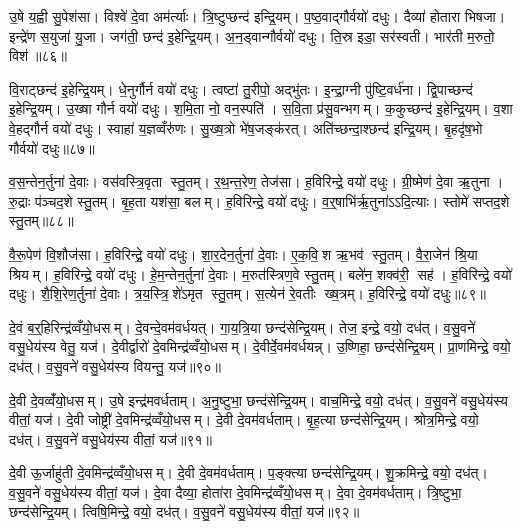 उ॒षे य॒ह्वी सु॒पेश॑सा। विश्वे॑ दे॒वा अम॑र्त्याः। त्रि॒ष्टुप्छन्द॑ इन्द्रि॒यम्। प॒ष्ठ॒वाद्गौर्वयो॑ दधुः। दैव्या॑ होतारा भिषजा। इन्द्रे॑ण स॒युजा॑ यु॒जा। जग॑ती॒ छन्द॑ इ॒हेन्द्रि॒यम्। अ॒न॒ड्वान्गौर्वयो॑ दधुः। ति॒स्र इडा॒ सर॑स्वती। भार॑ती म॒रुतो॒ विश॑॥८६॥

वि॒राट्छन्द॑ इ॒हेन्द्रि॒यम्। धे॒नुर्गौर्न वयो॑ दधुः। त्वष्टा॑ तु॒रीपो॒ अद्भु॑तः। इ॒न्द्रा॒ग्नी पु॑ष्टि॒वर्ध॑ना। द्वि॒पाच्छन्द॑ इ॒हेन्द्रि॒यम्। उ॒ख्षा गौर्न वयो॑ दधुः। श॒मि॒ता नो॒ वन॒स्पति॑। स॒वि॒ता प्र॑सु॒वन्भगम्। क॒कुच्छन्द॑ इ॒हेन्द्रि॒यम्। व॒शा वे॒हद्गौर्न वयो॑ दधुः। स्वाहा॑ य॒ज्ञव्वँरु॑णः। सु॒ख्ष॒त्रो भे॑ष॒जङ्क॑रत्। अति॑च्छन्दा॒श्छन्द॑ इन्द्रि॒यम्। बृ॒हदृ॑ष॒भो गौर्वयो॑ दधुः॥८७॥\anuvakamend[अम॑र्त्यस्तुर्य॒वाड्गौर्वयो॑ दधु॒र्विशो॑ व॒शा वे॒हद्गौर्न वयो॑ दधुश्च॒त्वारि॑ च]

व॒स॒न्तेन॒र्तुना॑ दे॒वाः। वस॑वस्त्रि॒वृता स्तु॒तम्। र॒थ॒न्त॒रेण॒ तेज॑सा। ह॒विरिन्द्रे॒ वयो॑ दधुः। ग्री॒ष्मेण॑ दे॒वा ऋ॒तुना। रु॒द्राः प॑ञ्चद॒शे स्तु॒तम्। बृ॒ह॒ता यश॑सा॒ बलम्। ह॒विरिन्द्रे॒ वयो॑ दधुः। व॒र्॒षाभि॑र्\mbox{}ऋ॒तुना॑ऽऽदि॒त्याः। स्तोमे॑ सप्तद॒शे स्तु॒तम्॥८८॥

वै॒रू॒पेण॑ वि॒शौज॑सा। ह॒विरिन्द्रे॒ वयो॑ दधुः। शा॒र॒देन॒र्तुना॑ दे॒वाः। ए॒क॒वि॒श ऋ॒भव॑ स्तु॒तम्। वै॒रा॒जेन॑ श्रि॒या श्रियम्। ह॒विरिन्द्रे॒ वयो॑ दधुः। हे॒म॒न्तेन॒र्तुना॑ दे॒वाः। म॒रुत॑स्त्रिण॒वे स्तु॒तम्। बले॑न॒ शक्व॑री॒ सह॑। ह॒विरिन्द्रे॒ वयो॑ दधुः। शै॒शि॒रेण॒र्तुना॑ दे॒वाः। त्र॒य॒स्त्रि॒शे॑ऽमृत स्तु॒तम्। स॒त्येन॑ रे॒वतीः ख्ष॒त्रम्। ह॒विरिन्द्रे॒ वयो॑ दधुः॥८९॥\anuvakamend[स्तोमे॑ सप्तद॒शे स्तु॒त सहो॑ ह॒विरिन्द्रे॒ वयो॑ दधुश्च॒त्वारि॑ च (व॒स॒न्तेन॑ ग्री॒ष्मेण॑ व॒र्‌षाभि॑श्शार॒देन॑ हेम॒न्तेन॑ शैशि॒रेण॒ षट् ॥ )]

दे॒वं ब॒र्॒हिरिन्द्र॑व्वँयो॒धसम्। दे॒वन्दे॒वम॑वर्धयत्। गा॒य॒त्रि॒या छन्द॑सेन्द्रि॒यम्। तेज॒ इन्द्रे॒ वयो॒ दध॑त्। व॒सु॒वने॑ वसु॒धेय॑स्य वेतु॒ यज॑। दे॒वीर्द्वारो॑ दे॒वमिन्द्र॑व्वँयो॒धसम्। दे॒वीर्दे॒वम॑वर्धयन्न्। उ॒ष्णिहा॒ छन्द॑सेन्द्रि॒यम्। प्रा॒णमिन्द्रे॒ वयो॒ दध॑त्। व॒सु॒वने॑ वसु॒धेय॑स्य वियन्तु॒ यज॑॥९०॥

दे॒वी दे॒वव्वँ॑यो॒धसम्। उ॒षे इन्द्र॑मवर्धताम्। अ॒नु॒ष्टुभा॒ छन्द॑सेन्द्रि॒यम्। वाच॒मिन्द्रे॒ वयो॒ दध॑त्। व॒सु॒वने॑ वसु॒धेय॑स्य वीतां॒ यज॑। दे॒वी जोष्ट्री॑ दे॒वमिन्द्र॑व्वँयो॒धसम्। दे॒वी दे॒वम॑वर्धताम्। बृ॒ह॒त्या छन्द॑सेन्द्रि॒यम्। श्रोत्र॒मिन्द्रे॒ वयो॒ दध॑त्। व॒सु॒वने॑ वसु॒धेय॑स्य वीतां॒ यज॑॥९१॥

दे॒वी ऊ॒र्जाहु॑ती दे॒वमिन्द्र॑व्वँयो॒धसम्। दे॒वी दे॒वम॑वर्धताम्। प॒ङ्क्त्या छन्द॑सेन्द्रि॒यम्। शु॒क्रमिन्द्रे॒ वयो॒ दध॑त्। व॒सु॒वने॑ वसु॒धेय॑स्य वीतां॒ यज॑। दे॒वा दैव्या॒ होता॑रा दे॒वमिन्द्र॑व्वँयो॒धसम्। दे॒वा दे॒वम॑वर्धताम्। त्रि॒ष्टुभा॒ छन्द॑सेन्द्रि॒यम्। त्विषि॒मिन्द्रे॒ वयो॒ दध॑त्। व॒सु॒वने॑ वसु॒धेय॑स्य वीतां॒ यज॑॥९२॥


